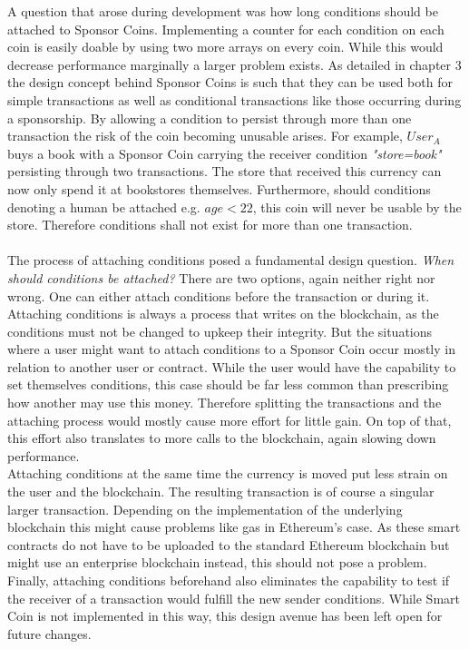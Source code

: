 A question that arose during development was how long conditions should be attached to Sponsor Coins. Implementing a counter for each condition on each coin is easily doable by using two more arrays on every coin. While this would decrease performance marginally a larger problem exists. As detailed in chapter 3 the design concept behind Sponsor Coins is such that they can be used both for simple transactions as well as conditional transactions like those occurring during a sponsorship. By allowing a condition to persist through more than one transaction the risk of the coin becoming unusable arises. For example, $User_A$ buys a book with a Sponsor Coin carrying the receiver condition \emph{"store=book"} persisting through two transactions. The store that received this currency can now only spend it at bookstores themselves. Furthermore, should conditions denoting a human be attached e.g. $age<22$, this coin will never be usable by the store. Therefore conditions shall not exist for more than one transaction.\\
\\
The process of attaching conditions posed a fundamental design question. \emph{When should conditions be attached?} There are two options, again neither right nor wrong. One can either attach conditions before the transaction or during it. Attaching conditions is always a process that writes on the blockchain, as the conditions must not be changed to upkeep their integrity. But the situations where a user might want to attach conditions to a Sponsor Coin occur mostly in relation to another user or contract. While the user would have the capability to set themselves conditions, this case should be far less common than prescribing how another may use this money. Therefore splitting the transactions and the attaching process would mostly cause more effort for little gain. On top of that, this effort also translates to more calls to the blockchain, again slowing down performance.\\
Attaching conditions at the same time the currency is moved put less strain on the user and the blockchain. The resulting transaction is of course a singular larger transaction. Depending on the implementation of the underlying blockchain this might cause problems like gas in Ethereum's case. As these smart contracts do not have to be uploaded to the standard Ethereum blockchain but might use an enterprise blockchain instead, this should not pose a problem.\\
Finally, attaching conditions beforehand also eliminates the capability to test if the receiver of a transaction would fulfill the new sender conditions. While Smart Coin is not implemented in this way, this design avenue has been left open for future changes.\\
